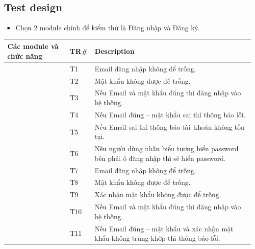 \documentclass[a4paper]{article}
\begin{document}
\subsection{Test design}
\begin{itemize}
    \item Chọn 2 module chính để kiểm thử là Đăng nhập và Đăng ký.
\end{itemize}
\begin{center}
    \renewcommand{\arraystretch}{1.5} %
    \setlength{\arrayrulewidth}{0.5mm} %
    \setlength{\tabcolsep}{5pt} %
    \begin{longtable}{|>{\centering\arraybackslash}m{4cm}|
        >{\centering\arraybackslash}m{4cm}|
        >{\raggedright\arraybackslash}m{7.5cm}|}
        \hline
        \textbf{Các module và chức năng} & \textbf{TR\#} & \textbf{Description} \\
        \hline
        \multirow{6}{=}{\centering Đăng nhập} 
        & T1 & Email đăng nhập không để trống. \\
        \cline{2-3}
        & T2 & Mật khẩu không được để trống. \\
        \cline{2-3}
        & T3 & Nếu Email và mật khẩu đúng thì đăng nhập vào hệ thống. \\
        \cline{2-3}
        & T4 & Nếu Email đúng – mật khẩu sai thì thông báo lỗi. \\
        \cline{2-3}
        & T5 & Nếu Email sai thì thông báo tài~khoản không tồn tại. \\
        \cline{2-3}
        & T6 & Nếu người dùng nhấn biểu tượng hiển password bên phải ô đăng nhập thì sẽ hiển password. \\
        \hline
        \multirow{5}{=}{\centering Đăng ký ngay} 
        & T7 & Email đăng nhập không để trống. \\
        \cline{2-3}
        & T8 & Mật khẩu không được để trống. \\
        \cline{2-3} 
        & T9 & Xác nhận mật khẩu không được để trống. \\
        \cline{2-3} 
        & T10 & Nếu Email và mật khẩu đúng thì đăng nhập vào hệ thống. \\
        \cline{2-3}
        & T11 & Nếu Email đúng – mật khẩu và xác nhận mật khẩu không trùng khớp thì thông báo lỗi. \\
        \hline
    \end{longtable}
\end{center}
\newpage
\end{document}
